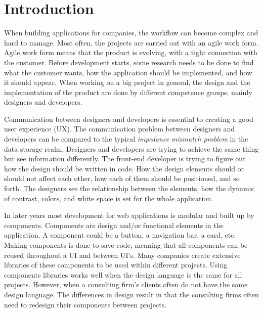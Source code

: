 \section{Introduction}



When building applications for companies, the workflow can become complex and hard to manage. Most often, the projects are carried out with an agile work form\cite{cohen2004introduction}. Agile work form means that the product is evolving, with a tight connection with the customer. Before development starts, some research needs to be done to find what the customer wants, how the application should be implemented, and how it should appear. When working on a big project in general, the design and the implementation of the product are done by different competence groups, mainly designers and developers. 

Communication between designers and developers is essential to creating a good user experience (UX). The communication problem between designers and developers can be compared to the typical \textit{impedance mismatch problem} in the data storage realm. Designers and developers are trying to achieve the same thing but see information differently. The front-end developer is trying to figure out how the design should be written in code. How the design elements should or should not affect each other, how each of them should be positioned, and so forth. The designers see the relationship between the elements, how the dynamic of contrast, colors, and white space is set for the whole application. 

In later years most development for web applications is modular and built up by components. Components are design and/or functional elements in the application. A component could be a button, a navigation bar, a card\cite{babichSimpleDesignTips2020}, etc. Making components is done to save code, meaning that all components can be reused throughout a UI and between UI's. Many companies create extensive libraries of these components to be used within different projects. Using components libraries works well when the design language is the same for all projects. However, when a consulting firm's clients often do not have the same design language. The differences in design result in that the consulting firms often need to redesign their components between projects. 



